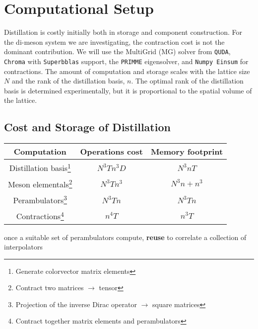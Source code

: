 
\chapter{Computational Setup}
\label{sec:comp}

Distillation is costly initially both in storage and component construction. For the di-meson system we are investigating, the contraction cost is not the dominant contribution. We will use the MultiGrid (MG) solver from \texttt{QUDA}, \texttt{Chroma} with \texttt{Superbblas} support, the \texttt{PRIMME} eigensolver, and \texttt{Numpy Einsum} for contractions. The amount of computation and storage scales with the lattice size $N$ and the rank of the distillation basis, $n$. The optimal rank of the distillation basis is determined experimentally, but it is proportional to the spatial volume of the lattice.

\section{Cost and Storage of Distillation}
      \vspace{1em}
       
         \begin{minipage}{16cm}
        \hspace*{2em}\begin{tabular}{ccc}
        Computation    & Operations cost & Memory footprint \\ \hline
        Distillation basis\footnote{Generate colorvector matrix elements}& $N^3Tn^3D$         & $N^3nT$      \\
        Meson elementals\footnote{Contract two matrices $\to$ tensor} & $N^3Tn^3$      & $N^3n + n^3$  \\
        Perambulators\footnote{Projection of the inverse Dirac operator $\to$ square matrices} & $N^3Tn$   & $N^3Tn$            \\
        Contractions\footnote{Contract together matrix elements and perambulators}   & $n^4T$    & $n^{3}T$   
        \end{tabular}
        \end{minipage}
        once a suitable set of perambulators compute, \textbf{reuse} to correlate a collection of interpolators
        
